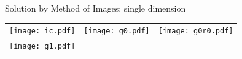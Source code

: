 \documentclass{beamer}
\begin{document}
\begin{frame}{Solution by Method of Images: single dimension}

\begin{centering}

\vspace{-15mm}

\begin{tabular}{ccc}

\hspace{-10mm}

\begin{minipage}{0.3\textwidth}

	\texttt{[image: ic.pdf]}

\end{minipage}

\pause



&



\begin{minipage}{0.3\textwidth}

	\texttt{[image: g0.pdf]}

\end{minipage}

\pause



&	



\begin{minipage}{0.3\textwidth}

	\texttt{[image: g0r0.pdf]}

\end{minipage}

\vspace{-15mm}

\\\hspace{-10mm}

\pause



\begin{minipage}{0.3\textwidth}

	\texttt{[image: g1.pdf]}

\end{minipage}

\pause



&



\begin{minipage}{0.3\textwidth}


\end{minipage}
\end{tabular}
\end{centering}
\end{frame}
\end{document}
